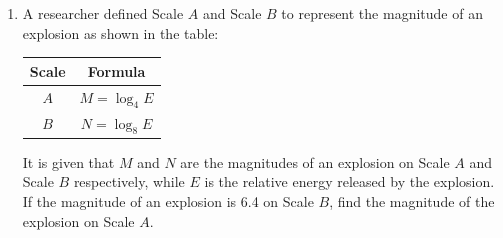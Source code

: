 \documentclass[11pt]{article}
\begin{document}
\begin{enumerate}
            \hrulefill
            
            \hrulefill
            
            \hrulefill
            
            \hrulefill
            
            \hrulefill
            
            \hrulefill
            
            \hrulefill
            
            \hrulefill
            
            \hrulefill

        \pagebreak
        \item A researcher defined Scale $A$ and Scale $B$ to represent the magnitude of an explosion as shown in the table:
        \begin{center}
            \begin{tabular}{ |c|c| }
                \hline
                Scale&Formula\\
                \hline
                $A$&$M=\log_4{E}$\\
                \hline
                $B$&$N=\log_8{E}$\\
                \hline
            \end{tabular}
        \end{center}
        It is given that $M$ and $N$ are the magnitudes of an explosion on Scale $A$ and Scale $B$ respectively, while $E$ is the relative energy released by the explosion. If the magnitude of an explosion is 6.4 on Scale $B$, find the magnitude of the explosion on Scale $A$.

        \hrulefill
            
            \hrulefill
            
            \hrulefill
            
            \hrulefill
            
            \hrulefill
            
            \hrulefill
            
            \hrulefill
            
            \hrulefill
            
            \hrulefill
            
            \hrulefill

            \hrulefill
            
            \hrulefill
            

\end{enumerate}
\end{document}
